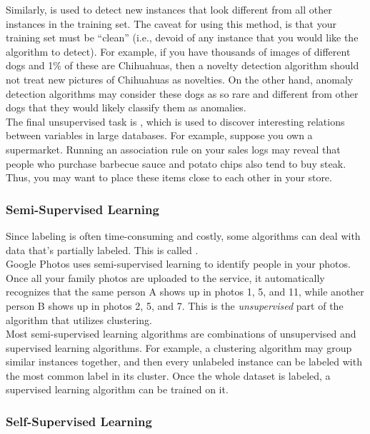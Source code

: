 Similarly,  is used to detect new instances that look different from all other instances in the training set. The caveat for using this method, is that your training set must be ``clean'' (i.e., devoid of any instance that you would like the algorithm to detect). For example, if you have thousands of images of different dogs and 1\% of these are Chihuahuas, then a novelty detection algorithm should not treat new pictures of Chihuahuas as novelties. On the other hand, anomaly detection algorithms may consider these dogs as so rare and different from other dogs that they would likely classify them as anomalies. \\

The final unsupervised task is , which is used to discover interesting relations between variables in large databases. For example, suppose you own a supermarket. Running an association rule on your sales logs may reveal that people who purchase barbecue sauce and potato chips also tend to buy steak. Thus, you may want to place these items close to each other in your store.

\subsubsection{Semi-Supervised Learning}
\label{subsubsec:semi_supervised_learning}

Since labeling is often time-consuming and costly, some algorithms can deal with data that's partially labeled. This is called . \\

Google Photos uses semi-supervised learning to identify people in your photos. Once all your family photos are uploaded to the service, it automatically recognizes that the same person A shows up in photos 1, 5, and 11, while another person B shows up in photos 2, 5, and 7. This is the \textit{unsupervised} part of the algorithm that utilizes clustering. \\

Most semi-supervised learning algorithms are combinations of unsupervised and supervised learning algorithms. For example, a clustering algorithm may group similar instances together, and then every unlabeled instance can be labeled with the most common label in its cluster. Once the whole dataset is labeled, a supervised learning algorithm can be trained on it.

\subsubsection{Self-Supervised Learning}
\label{subsubsec:self_supervised_learning}



